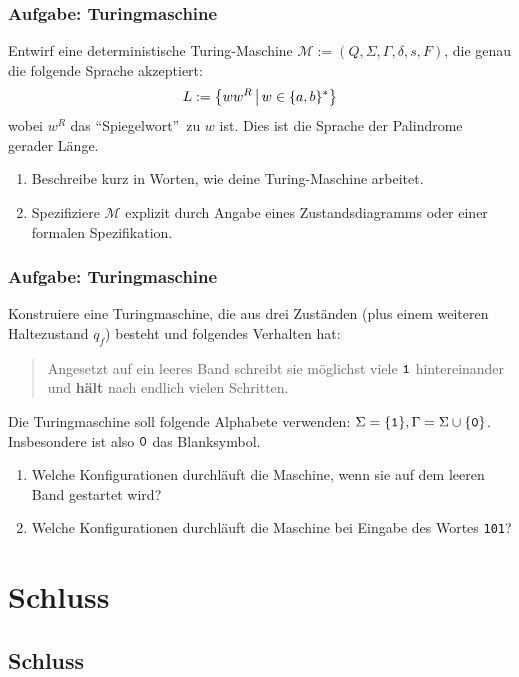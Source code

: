\begin{frame}
\frametitle{Aufgabe: Turingmaschine}
Entwirf eine deterministische Turing-Maschine $\mathcal M := (Q, \Sigma, \Gamma, \delta, s, F)$, die genau die folgende Sprache akzeptiert: $$L:=\left\lbrace ww^R \,\middle\vert\,  w \in \{a, b\}^* \right\rbrace$$ wobei $w^R$ das "`Spiegelwort"'~zu $w$ ist.
Dies ist die Sprache der Palindrome gerader Länge.

\begin{enumerate}
	\item Beschreibe kurz in Worten, wie deine Turing-Maschine arbeitet.
	\item Spezifiziere $\mathcal M$ explizit durch Angabe eines Zustandsdiagramms oder einer formalen Spezifikation.
\end{enumerate}
\end{frame}
\begin{frame}
\frametitle{Aufgabe: Turingmaschine}
 \label{sec:busy_beaver}

Konstruiere eine Turingmaschine, die aus drei Zuständen (plus einem
weiteren Haltezustand $q_f$) besteht und folgendes Verhalten hat:
\begin{quote}
  Angesetzt auf ein leeres Band schreibt sie möglichst viele ${\tt 1}$
  hintereinander und \textbf{hält} nach endlich vielen Schritten.
\end{quote}
Die Turingmaschine soll folgende Alphabete verwenden: $\Sigma = \{{\tt 1}\},
\Gamma = \Sigma \cup \{{\tt 0}\}$.  Insbesondere ist also ${\tt 0}$ das
Blanksymbol.

\begin{enumerate}
	\item Welche Konfigurationen durchläuft die Maschine, wenn sie auf dem leeren Band gestartet wird?
	\item Welche Konfigurationen durchläuft die Maschine bei Eingabe
des Wortes {\tt 101}?
\end{enumerate}
\end{frame}

\section{Schluss}
\subsection{Schluss}


